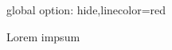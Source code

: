 \documentclass{article}
\begin{document}
{global option: hide,linecolor=red}


Lorem
impsum
\end{document}
